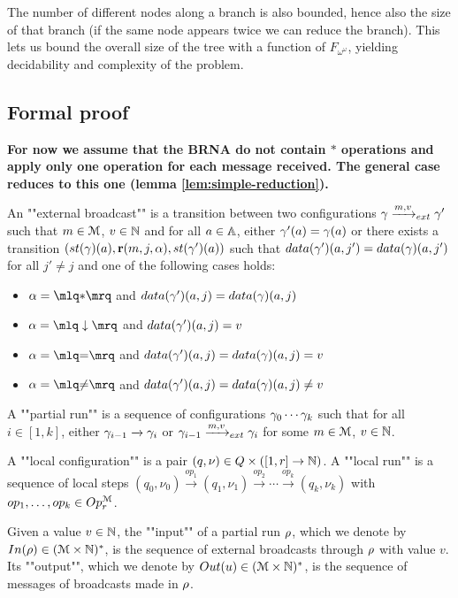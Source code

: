  The number of different nodes along a branch is also bounded, hence also the size of that branch (if the same node appears twice we can reduce the branch).
 This lets us bound the overall size of the tree with a function of $F_{\omega^\omega}$, yielding decidability and complexity of the problem.

\subsection{Formal proof}
\fi


\textbf{For now we assume that the BRNA do not contain $*$ operations and apply only one operation for each message received. The general case reduces to this one (lemma \ref{lem:simple-reduction}).}

\begin{definition}
	An ""external broadcast"" is a transition between two configurations $\gamma \xrightarrow{m, v}_{ext} \gamma'$ such that $m \in \mathcal{M}$, $v \in \mathbb{N}$ and for all $a \in \mathbb{A}$, either $\gamma'(a) = \gamma(a)$ or there exists a transition $(\st{\config}(a),\rec{m}{j}{\anact},\st{\config'}(a))$
	such that $\data{\config'}(a, j') = \data{\config}(a, j')$ for all $j' \neq j$ and one of the following cases holds:
		\begin{itemize}
			\item $\anact = \quotemarks{\dummyact}$ 
			and $\data{\config'}(a,j) = \data{\config}(a,j)$
			\item $\anact = \quotemarks{\enregact}$ and $\data{\config'}(a,j) = v$
			\item $\anact = \quotemarks{\eqtestact}$ and $\data{\config'}(a,j) = \data{\config}(a,j) =v$
			\item $\anact = \quotemarks{\diseqtestact}$ and $\data{\config'}(a,j) = \data{\config}(a,j) \ne v$
		\end{itemize}
		
		
	A ""partial run"" is a sequence of configurations $\gamma_0 \cdots \gamma_k$  such that for all $i \in [1, k]$, either $\gamma_{i-1} \xrightarrow{} \gamma_{i}$ or $\gamma_{i-1} \xrightarrow{m, v}_{ext} \gamma_{i}$ for some $m \in \mathcal{M}$, $v\in \mathbb{N}$. 
	
	A ""local configuration"" is a pair $(q, \nu) \in Q \times ([1,r] \to \mathbb{N})$.
	A ""local run"" is a sequence of local steps $(q_0, \nu_0) \xrightarrow{op_1} (q_1, \nu_1) \xrightarrow{op_2} \cdots \xrightarrow{op_k} (q_k, \nu_k)$ with $op_1, \ldots, op_k \in Op_r^{\mathcal{M}}$. 
	
	Given a value $v \in \mathbb{N}$, the ""input"" of a partial run $\rho$, which we denote by $In(\rho) \in (\mathcal{M} \times \mathbb{N})^*$, is the sequence of external broadcasts through $\rho$ with value $v$.
	Its ""output"", which we denote by $Out(u) \in (\mathcal{M} \times \mathbb{N})^*$, is the sequence of messages of broadcasts made in $\rho$. 
	

\end{definition}
